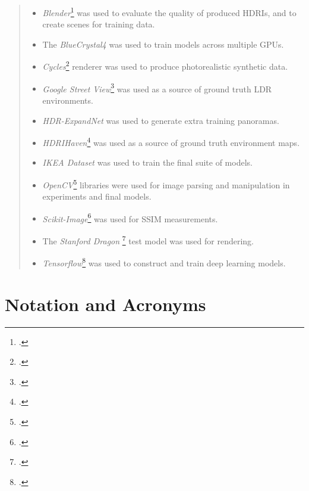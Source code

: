 \documentclass[ %
                    author={Gavin Parker},
                supervisor={Dr. Neill Campbell},
                    degree={MEng},
                     title={Deep Learning for Illumination Estimation from Stereo Images},
                  subtitle={},
                      type={Research},
                      year={2018} ]{dissertation}
\begin{document}
\vspace{1cm} 
\begin{quote}
\noindent
\begin{itemize}
\item \textit{Blender}\footcite{blender.org} was used to evaluate the quality of produced HDRIs, and to create scenes for training data.
\item The \textit{BlueCrystal4} was used to train models across multiple GPUs.
\item \textit{Cycles}\footcite{cycles-renderer.org}
 renderer was used to produce photorealistic synthetic data.
\item \textit{Google Street View}\footcite{cloud.google.com/maps-platform/} was used as a source of ground truth LDR environments.
\item \textit{HDR-ExpandNet}\cite{2018arXiv180302266M} was used to generate extra training panoramas.
\item \textit{HDRIHaven}\footcite{hdrihaven.com} was used as a source of ground truth environment maps.
\item \textit{IKEA Dataset}\cite{lpt2013ikea} was used to train the final suite of models.
\item \textit{OpenCV}\footcite{opencv.org} libraries were used for image parsing and manipulation in experiments and final models.
\item \textit{Scikit-Image}\footcite{scikit-image.org/} was used for SSIM measurements.
\item The \textit{Stanford Dragon} \footcite{graphics.stanford.edu/data/3Dscanrep/} test model was used for rendering.
\item \textit{Tensorflow}\footcite{tensorflow.org} was used to construct and train deep learning models.


\end{itemize}
\end{quote}


\chapter*{Notation and Acronyms}
\end{document}
